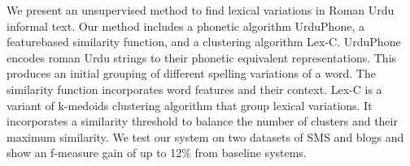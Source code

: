 We present an unsupervised method to find lexical variations in Roman Urdu informal text. Our method includes a phonetic algorithm UrduPhone, a featurebased similarity function, and a clustering algorithm Lex-C. UrduPhone encodes roman Urdu strings to their phonetic equivalent representations. This produces an initial grouping of different spelling variations of a word. The similarity function incorporates word features and their context. Lex-C is a variant of k-medoids clustering algorithm that group lexical variations. It incorporates a similarity threshold to balance the number of clusters and their maximum similarity. We test our system on two datasets of SMS and blogs and show an f-measure gain of up to 12\% from baseline systems.

